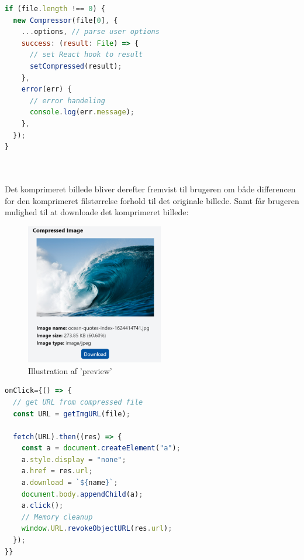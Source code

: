\documentclass[12pt]{article}
\begin{document}
  \begin{minipage}{.55\textwidth}
  \begin{lstlisting}[language=JavaScript, caption=Indsættelse af fil i Compressorjs bibliotek]
if (file.length !== 0) {
  new Compressor(file[0], {
    ...options, // parse user options
    success: (result: File) => {
      // set React hook to result
      setCompressed(result); 
    },
    error(err) {
      // error handeling
      console.log(err.message);
    },
  });
}
  \end{lstlisting}
\end{minipage}\\\\
Det komprimeret billede bliver derefter fremvist til brugeren om både differencen for den komprimeret filstørrelse forhold til det originale billede.
Samt får brugeren mulighed til at downloade det komprimeret billede:\\
\noindent\begin{minipage}{.4\textwidth}
  \begin{figure}[H]
    \centering
    \includegraphics[width=6cm]{1.png}%
    \caption{\centering Illustration af 'preview'}%
  \end{figure}
  \end{minipage}\hfill
  \begin{minipage}{.55\textwidth}
    \begin{lstlisting}[language=JavaScript, caption=Download komprimeret billede med knap]
onClick={() => {
  // get URL from compressed file
  const URL = getImgURL(file); 

  fetch(URL).then((res) => { 
    const a = document.createElement("a");
    a.style.display = "none";
    a.href = res.url;
    a.download = `${name}`; 
    document.body.appendChild(a);
    a.click();
    // Memory cleanup
    window.URL.revokeObjectURL(res.url); 
  });
}}
   \end{lstlisting}
\end{minipage}
\end{document}
